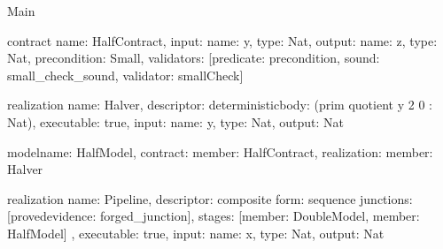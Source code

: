 \begin{lexlean}{Main}
\begin{semanticmodule}
contract{
  name: HalfContract,
  input: {name: y, type: Nat},
  output: {name: z, type: Nat},
  precondition: Small,
  validators: [{predicate: precondition, sound: small_check_sound, validator: smallCheck}]
}

realization{
  name: Halver,
  descriptor: deterministic{body: (prim quotient y 2 0 : Nat)},
  executable: true,
  input: {name: y, type: Nat},
  output: Nat
}

model{name: HalfModel, contract: {member: HalfContract}, realization: {member: Halver}}

realization{
  name: Pipeline,
  descriptor: composite{
    form: sequence{
      junctions: [proved{evidence: forged_junction}],
      stages: [{member: DoubleModel}, {member: HalfModel}]
    }
  },
  executable: true,
  input: {name: x, type: Nat},
  output: Nat
}
\end{semanticmodule}
\end{lexlean}
